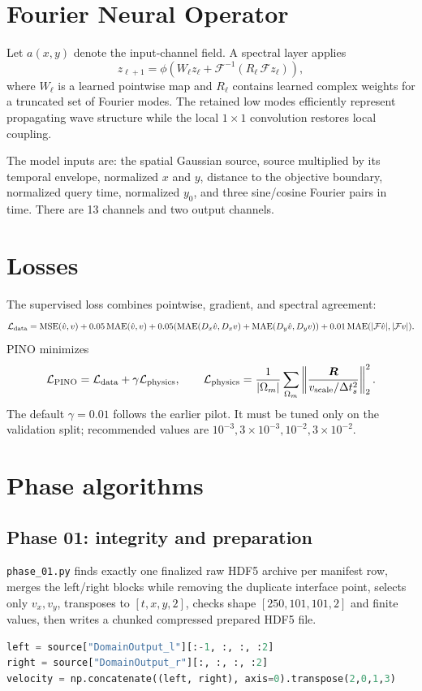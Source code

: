\documentclass[11pt]{article}
\begin{document}
\section{Fourier Neural Operator}
Let $a(x,y)$ denote the input-channel field.  A spectral layer applies
\begin{equation}
 z_{\ell+1}=\phi\!\left(W_\ell z_\ell+
 \mathcal{F}^{-1}\!\left(R_\ell\,\mathcal{F}z_\ell\right)\right),
\end{equation}
where $W_\ell$ is a learned pointwise map and $R_\ell$ contains learned complex
weights for a truncated set of Fourier modes.  The retained low modes efficiently
represent propagating wave structure while the local $1\times1$ convolution restores
local coupling.

The model inputs are: the spatial Gaussian source, source multiplied by its temporal
envelope, normalized $x$ and $y$, distance to the objective boundary, normalized
query time, normalized $y_0$, and three sine/cosine Fourier pairs in time.  There are
13 channels and two output channels.

\section{Losses}
The supervised loss combines pointwise, gradient, and spectral agreement:
\begin{equation}
 \mathcal{L}_{\rm data}=\operatorname{MSE}(\hat v,v)
 +0.05\operatorname{MAE}(\hat v,v)
 +0.05(\operatorname{MAE}(D_x\hat v,D_xv)+\operatorname{MAE}(D_y\hat v,D_yv))
 +0.01\operatorname{MAE}(|\mathcal{F}\hat v|,|\mathcal{F}v|).
\end{equation}
PINO minimizes
\begin{equation}
 \mathcal{L}_{\rm PINO}=\mathcal{L}_{\rm data}+\gamma\mathcal{L}_{\rm physics},
 \qquad
 \mathcal{L}_{\rm physics}=\frac{1}{|\Omega_m|}\sum_{\Omega_m}
 \left\|\frac{\bm R}{v_{\rm scale}/\Delta t_s^2}\right\|_2^2.
\end{equation}
The default $\gamma=0.01$ follows the earlier pilot.  It must be tuned only on the
validation split; recommended values are $10^{-3},3\times10^{-3},10^{-2},3\times
10^{-2}$.

\section{Phase algorithms}
\subsection{Phase 01: integrity and preparation}
\texttt{phase\_01.py} finds exactly one finalized raw HDF5 archive per manifest row,
merges the left/right blocks while removing the duplicate interface point, selects
only $v_x,v_y$, transposes to $[t,x,y,2]$, checks shape $[250,101,101,2]$ and finite
values, then writes a chunked compressed prepared HDF5 file.
\begin{lstlisting}[language=Python]
left = source["DomainOutput_l"][:-1, :, :, :2]
right = source["DomainOutput_r"][:, :, :, :2]
velocity = np.concatenate((left, right), axis=0).transpose(2,0,1,3)
\end{lstlisting}
\end{document}
